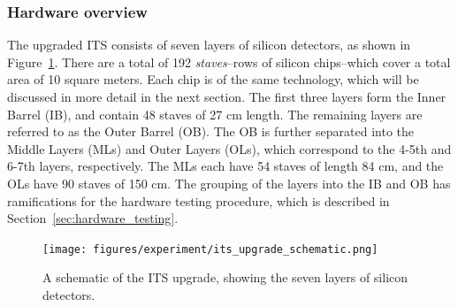 \subsubsection{Hardware overview}
The upgraded ITS consists of seven layers of silicon detectors, as shown in Figure~\ref{fig:its_upgrade_schematic}. There are a total of 192 \textit{staves}--rows of silicon chips--which cover a total area of 10 square meters. Each chip is of the same technology, which will be discussed in more detail in the next section. The first three layers form the Inner Barrel (IB), and contain 48 staves of 27 cm length. The remaining layers are referred to as the Outer Barrel (OB). The OB is further separated into the Middle Layers (MLs) and Outer Layers (OLs), which correspond to the 4-5th and 6-7th layers, respectively. The MLs each have 54 staves of length 84 cm, and the OLs have 90 staves of 150 cm. The grouping of the layers into the IB and OB has ramifications for the hardware testing procedure, which is described in Section~\ref{sec:hardware_testing}.

\begin{figure}
    \centering
    \texttt{[image: figures/experiment/its\_upgrade\_schematic.png]}
    \caption{A schematic of the ITS upgrade, showing the seven layers of silicon detectors.}
    \label{fig:its_upgrade_schematic}
\end{figure}



